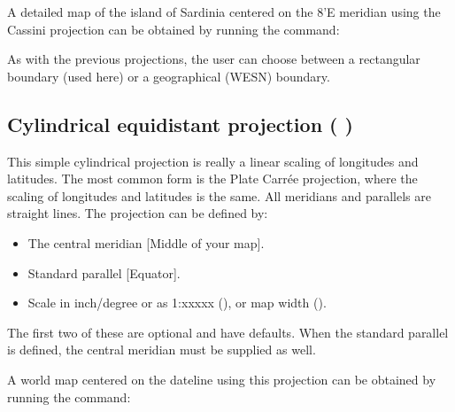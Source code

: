 A detailed map of the island of Sardinia centered on the
8'E meridian using the Cassini projection can be
obtained by running the command:



As with the previous projections, the user can choose between
a rectangular boundary (used here) or a geographical (WESN)
boundary.


\subsection{Cylindrical equidistant projection ( )}


This simple cylindrical projection is really a linear scaling
of longitudes and latitudes.
The most common form is the Plate Carr\'{e}e projection, where the scaling of longitudes and latitudes is the same.
All meridians and parallels are straight lines.  The projection can be defined by:
\begin{itemize} 
\item The central meridian [Middle of your map].
\item Standard parallel [Equator].
\item Scale in inch/degree or as 1:xxxxx (), or map width ().
\end{itemize}
The first two of these are optional and have defaults. When the standard parallel is defined, the central meridian must be supplied as well.

A world map centered on the dateline using this projection
can be obtained by running the command:


